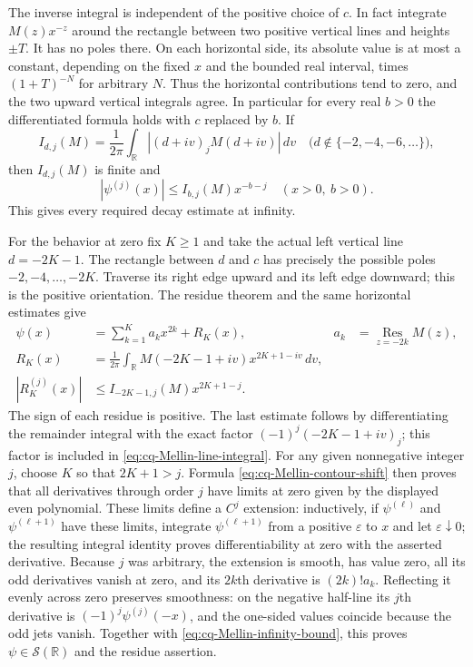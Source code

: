 The inverse integral is independent of the positive choice of
$c$. In fact integrate $M(z)x^{-z}$ around the rectangle
between two positive vertical lines and heights $\pm T$.
It has no poles there. On each horizontal side, its absolute
value is at most a constant, depending on the fixed $x$ and
the bounded real interval, times $(1+T)^{-N}$ for arbitrary
$N$. Thus the horizontal contributions tend to zero, and the
two upward vertical integrals agree. In particular for every
real $b>0$ the differentiated formula holds with $c$ replaced
by $b$. If
\begin{equation}\label{eq:cq-Mellin-line-integral}
 I_{d,j}(M)=\frac1{2\pi}\int_{\mathbb R}
                |(d+iv)_jM(d+iv)|\,dv
 \quad\bigl(d\notin\{-2,-4,-6,\ldots\}\bigr),
\end{equation}
then $I_{d,j}(M)$ is finite and
\begin{equation}\label{eq:cq-Mellin-infinity-bound}
 |\psi^{(j)}(x)|\leq I_{b,j}(M)x^{-b-j}
 \quad(x>0,\ b>0).
\end{equation}
This gives every required decay estimate at infinity.

For the behavior at zero fix $K\geq1$ and take the actual
left vertical line $d=-2K-1$. The rectangle between $d$ and
$c$ has precisely the possible poles $-2,-4,\ldots,-2K$.
Traverse its right edge upward and its left edge downward;
this is the positive orientation. The residue theorem and
the same horizontal estimates give
\begin{equation}\label{eq:cq-Mellin-contour-shift}
 \begin{aligned}
 \psi(x)&=\sum_{k=1}^K a_kx^{2k}+R_K(x),
 &a_k&=\operatorname*{Res}_{z=-2k}M(z),\\
 R_K(x)&=\frac1{2\pi}\int_{\mathbb R}
                    M(-2K-1+iv)x^{2K+1-iv}\,dv,\\
 |R_K^{(j)}(x)|&\leq I_{-2K-1,j}(M)x^{2K+1-j}.
 \end{aligned}
\end{equation}
The sign of each residue is positive. The last estimate follows
by differentiating the remainder integral with the exact factor
$(-1)^j(-2K-1+iv)_j$; this factor is included in
\eqref{eq:cq-Mellin-line-integral}.
For any given nonnegative integer $j$, choose $K$ so that
$2K+1>j$. Formula \eqref{eq:cq-Mellin-contour-shift} then
proves that all derivatives through order $j$ have limits at zero
given by the displayed even polynomial. These limits define a
$C^j$ extension: inductively, if $\psi^{(\ell)}$ and
$\psi^{(\ell+1)}$ have these limits, integrate
$\psi^{(\ell+1)}$ from a positive $\varepsilon$ to $x$ and
let $\varepsilon\downarrow0$; the resulting integral identity
proves differentiability at zero with the asserted derivative.
Because $j$ was arbitrary, the extension is smooth, has value
zero, all its odd derivatives vanish at zero, and its $2k$th
derivative is $(2k)!a_k$. Reflecting it evenly across zero
preserves smoothness: on the negative half-line its $j$th
derivative is $(-1)^j\psi^{(j)}(-x)$, and the one-sided
values coincide because the odd jets vanish. Together with
\eqref{eq:cq-Mellin-infinity-bound}, this proves
$\psi\in\mathcal S(\mathbb R)$ and the residue assertion.

